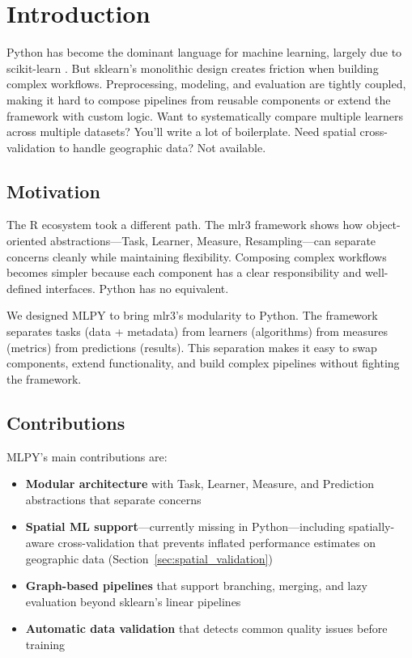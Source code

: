 \documentclass[twoside,11pt]{article}
\begin{document}
\section{Introduction}
\label{sec:intro}

Python has become the dominant language for machine learning, largely due to
scikit-learn \citep{pedregosa2011scikit}. But sklearn's monolithic design
creates friction when building complex workflows. Preprocessing, modeling, and
evaluation are tightly coupled, making it hard to compose pipelines from reusable
components or extend the framework with custom logic. Want to systematically
compare multiple learners across multiple datasets? You'll write a lot of
boilerplate. Need spatial cross-validation to handle geographic data? Not available.

\subsection{Motivation}

The R ecosystem took a different path. The mlr3 framework \citep{lang2019mlr3}
shows how object-oriented abstractions---Task, Learner, Measure, Resampling---can
separate concerns cleanly while maintaining flexibility. Composing complex workflows
becomes simpler because each component has a clear responsibility and well-defined
interfaces. Python has no equivalent.

We designed MLPY to bring mlr3's modularity to Python. The framework separates
tasks (data + metadata) from learners (algorithms) from measures (metrics) from
predictions (results). This separation makes it easy to swap components, extend
functionality, and build complex pipelines without fighting the framework.

\subsection{Contributions}

MLPY's main contributions are:

\begin{itemize}
  \item \textbf{Modular architecture} with Task, Learner, Measure, and Prediction
        abstractions that separate concerns
  \item \textbf{Spatial ML support}---currently missing in Python---including
        spatially-aware cross-validation that prevents inflated performance estimates
        on geographic data (Section~\ref{sec:spatial_validation})
  \item \textbf{Graph-based pipelines} that support branching, merging, and
        lazy evaluation beyond sklearn's linear pipelines
  \item \textbf{Automatic data validation} that detects common quality issues
        before training
\end{itemize}
\end{document}
